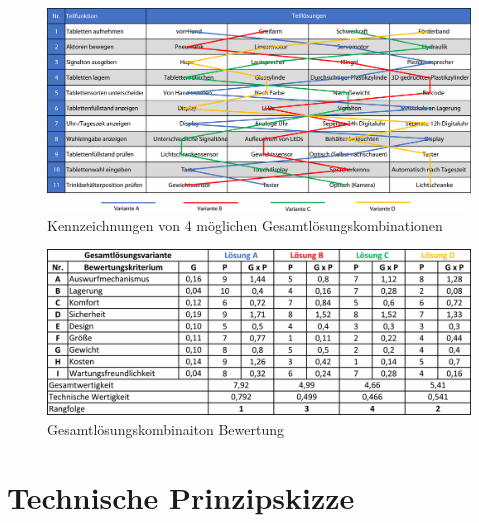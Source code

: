 \begin{figure}[H]
	\centering
	\includegraphics[width=1.0\linewidth]{chapter/Bilder/loesungskombinationen}
	\caption{Kennzeichnungen von 4 möglichen Gesamtlösungskombinationen}
	\label{fig:losungskombinationen}
\end{figure}

\begin{figure}[H]
	\centering
	\includegraphics[width=1.0\linewidth]{chapter/Bilder/nutzwertanalyse}
	\caption{Gesamtlösungskombinaiton Bewertung}
	\label{fig:nutzwertanalyse}
\end{figure}

\newpage
\section{Technische Prinzipskizze}

